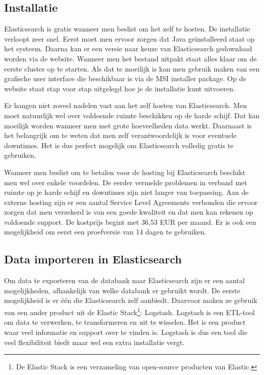 \subsection{Installatie}
\label{Installatie}

Elasticsearch is gratis wanneer men beslist om het zelf te hosten. De installatie verloopt zeer snel. Eerst moet men ervoor zorgen dat Java geïnstalleerd staat op het systeem. Daarna kan er een versie naar keuze van Elasticsearch gedownload worden via de website. Wanneer men het bestand uitpakt staat alles klaar om de eerste cluster op te starten. Als dat te moeilijk is kan men gebruik maken van een grafische user interface die beschikbaar is via de MSI installer package. Op de website staat stap voor stap uitgelegd hoe je de installatie kunt uitvoeren. 

Er hangen niet zoveel nadelen vast aan het zelf hosten van Elasticsearch. Men moet natuurlijk wel over voldoende ruimte beschikken op de harde schijf. Dat kan moeilijk worden wanneer men met grote hoeveelheden data werkt. Daarnaast is het belangrijk om te weten dat men zelf verantwoordelijk is voor eventuele downtimes. Het is dus perfect mogelijk om Elasticsearch volledig gratis te gebruiken. 

Wanneer men beslist om te betalen voor de hosting bij Elasticsearch beschikt men wel over enkele voordelen. De eerder vermelde problemen in verband met ruimte op je harde schijf en downtimes zijn niet langer van toepassing. Aan de externe hosting zijn er een aantal Service Level Agreements verbonden die ervoor zorgen dat men verzekerd is van een goede kwaliteit en dat men kan rekenen op voldoende support. De kostprijs begint met 36,53 EUR per maand. Er is ook een mogelijkheid om eerst een proefversie van 14 dagen te gebruiken.

\subsection{Data importeren in Elasticsearch}

Om data te exporteren van de databank naar Elasticsearch zijn er een aantal mogelijkheden, afhankelijk van welke databank er gebruikt wordt. De eerste mogelijkheid is er één die Elasticsearch zelf aanbiedt. Daarvoor maken ze gebruik van een ander product uit de Elastic Stack\footnote{De Elastic Stack is een verzameling van open-source producten van Elastic.}: Logstash. Logstash is een ETL-tool om data te verwerken, te transformeren en uit te wisselen. Het is een product waar veel informatie en support over te vinden is. Logstash is dus een tool die veel flexibiliteit biedt maar wel een extra installatie vergt. 

